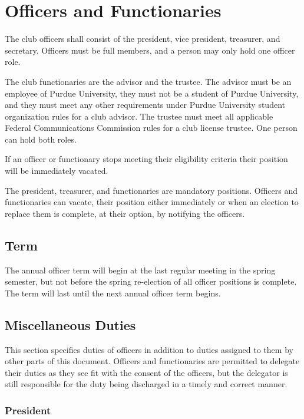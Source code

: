 \documentclass{article}
\begin{document}
\section{Officers and Functionaries}

The club officers shall consist of the president, vice president, treasurer, and
secretary. Officers must be full members, and a person may only hold one officer
role.

The club functionaries are the advisor and the trustee. The advisor must be an
employee of Purdue University, they must not be a student of Purdue University,
and they must meet any other requirements under Purdue University student
organization rules for a club advisor. The trustee must meet all applicable
Federal Communications Commission rules for a club license trustee. One person
can hold both roles.

If an officer or functionary stops meeting their eligibility criteria their
position will be immediately vacated.

The president, treasurer, and functionaries are mandatory positions. Officers
and functionaries can vacate, their position either immediately or when an
election to replace them is complete, at their option, by notifying the
officers.

\subsection{Term}

The annual officer term will begin at the last regular meeting in the spring
semester, but not before the spring re-election of all officer positions is
complete. The term will last until the next annual officer term begins.

\subsection{Miscellaneous Duties}

This section specifies duties of officers in addition to duties assigned to them
by other parts of this document. Officers and functionaries are permitted to
delegate their duties as they see fit with the consent of the officers, but the
delegator is still responsible for the duty being discharged in a timely and
correct manner.

\subsubsection{President}
\end{document}

